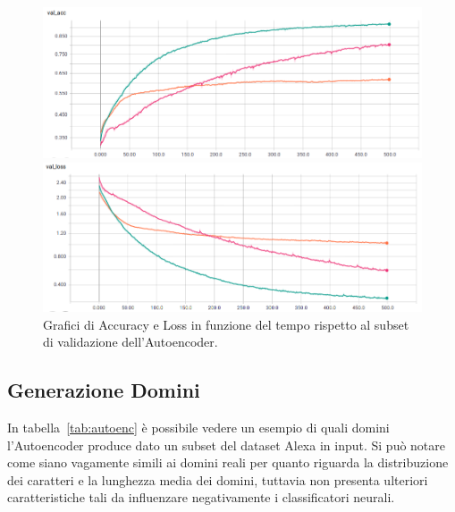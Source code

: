 \begin{figure}[!bp]
    \centering
    \begin{minipage}[t]{\linewidth}
    	\includegraphics[width=\linewidth]{figures/autoenc3.png}
    \end{minipage}
    \begin{minipage}[b]{\linewidth}
    	\includegraphics[width=\linewidth]{figures/autoenc4.png}
    \end{minipage}
    
\caption{Grafici di Accuracy e Loss in funzione del tempo rispetto al subset di validazione dell'Autoencoder. \label{fig:aut2} }
\end{figure}

\newpage
\subsection{Generazione Domini}
In tabella~\ref{tab:autoenc} è possibile vedere un esempio di quali domini l'Autoencoder produce dato un subset del dataset Alexa in input. Si può notare come siano vagamente simili ai domini reali per quanto riguarda la distribuzione dei caratteri e la lunghezza media dei domini, tuttavia non presenta ulteriori caratteristiche tali da influenzare negativamente i classificatori neurali.

